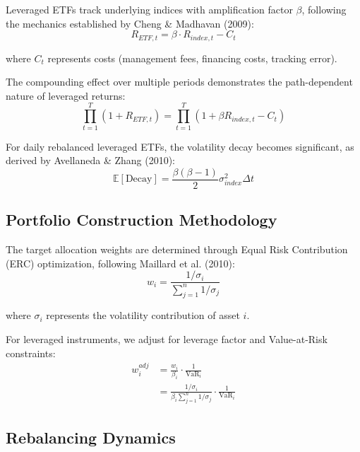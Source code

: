 \documentclass[onecolumn,ieee]{arithmaxresearch}
\begin{document}
Leveraged ETFs track underlying indices with amplification factor $\beta$, following the mechanics established by Cheng \& Madhavan (2009):
\begin{equation}
R_{ETF,t} = \beta \cdot R_{index,t} - C_t
\end{equation}

where $C_t$ represents costs (management fees, financing costs, tracking error).

The compounding effect over multiple periods demonstrates the path-dependent nature of leveraged returns:
\begin{equation}
\prod_{t=1}^T (1 + R_{ETF,t}) = \prod_{t=1}^T (1 + \beta R_{index,t} - C_t)
\end{equation}

For daily rebalanced leveraged ETFs, the volatility decay becomes significant, as derived by Avellaneda \& Zhang (2010):
\begin{equation}
\mathbb{E}[\text{Decay}] = \frac{\beta(\beta-1)}{2} \sigma^2_{index} \Delta t
\end{equation}

\subsection{Portfolio Construction Methodology}

The target allocation weights are determined through Equal Risk Contribution (ERC) optimization, following Maillard et al. (2010):
\begin{equation}
w_i = \frac{1/\sigma_i}{\sum_{j=1}^n 1/\sigma_j}
\end{equation}

where $\sigma_i$ represents the volatility contribution of asset $i$.

For leveraged instruments, we adjust for leverage factor and Value-at-Risk constraints:
\begin{equation}
\begin{aligned}
w_i^{adj} &= \frac{w_i}{\beta_i} \cdot \frac{1}{\text{VaR}_i} \\
&= \frac{1/\sigma_i}{\beta_i \sum_{j=1}^n 1/\sigma_j} \cdot \frac{1}{\text{VaR}_i}
\end{aligned}
\end{equation}

\subsection{Rebalancing Dynamics}
\end{document}
